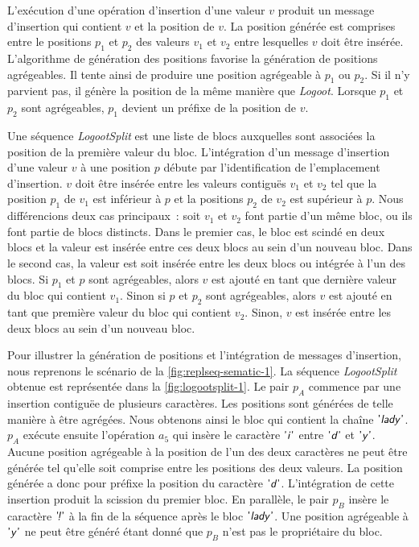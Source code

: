 L'exécution d'une opération d'insertion d'une valeur $v$ produit un message d'insertion qui contient $v$ et la position de $v$.
La position générée est comprises entre le positions $p_1$ et $p_2$ des valeurs $v_1$ et $v_2$ entre lesquelles $v$ doit être insérée.
L'algorithme de génération des positions favorise la génération de positions agrégeables.
Il tente ainsi de produire une position agrégeable à $p_1$ ou $p_2$.
Si il n'y parvient pas, il génère la position de la même manière que \emph{Logoot}.
Lorsque $p_1$ et $p_2$ sont agrégeables, $p_1$ devient un préfixe de la position de $v$.

Une séquence \emph{LogootSplit} est une liste de blocs auxquelles sont associées la position de la première valeur du bloc.
L'intégration d'un message d'insertion d'une valeur $v$ à une position $p$ débute par l'identification de l'emplacement d'insertion.
$v$ doit être insérée entre les valeurs contiguës $v_1$ et $v_2$ tel que la position $p_1$ de $v_1$ est inférieur à $p$ et la positions $p_2$ de $v_2$ est supérieur à $p$.
Nous différencions deux cas principaux~: soit $v_1$ et $v_2$ font partie d'un même bloc, ou ils font partie de blocs distincts.
Dans le premier cas, le bloc est scindé en deux blocs et la valeur est insérée entre ces deux blocs au sein d'un nouveau bloc.
Dans le second cas, la valeur est soit insérée entre les deux blocs ou intégrée à l'un des blocs.
Si $p_1$ et $p$ sont agrégeables, alors $v$ est ajouté en tant que dernière valeur du bloc qui contient $v_1$.
Sinon si $p$ et $p_2$ sont agrégeables, alors $v$ est ajouté en tant que première valeur du bloc qui contient $v_2$.
Sinon, $v$ est insérée entre les deux blocs au sein d'un nouveau bloc.

Pour illustrer la génération de positions et l'intégration de messages d'insertion, nous reprenons le scénario de la \autoref{fig:replseq-sematic-1}.
La séquence \emph{LogootSplit} obtenue est représentée dans la \autoref{fig:logootsplit-1}.
Le pair $p_A$ commence par une insertion contiguëe de plusieurs caractères.
Les positions sont générées de telle manière à être agrégées.
Nous obtenons ainsi le bloc qui contient la chaîne $\textsf{'\textit{lady}'}$.
$p_A$ exécute ensuite l'opération $a_5$ qui insère le caractère $\textsf{'\textit{i}'}$ entre $\textsf{'\textit{d}'}$ et $\textsf{'\textit{y}'}$.
Aucune position agrégeable à la position de l'un des deux caractères ne peut être générée tel qu'elle soit comprise entre les positions des deux valeurs.
La position générée a donc pour préfixe la position du caractère $\textsf{'\textit{d}'}$.
L'intégration de cette insertion produit la scission du premier bloc.
En parallèle, le pair $p_B$ insère le caractère $\textsf{'\textit{\negthinspace!}'}$ à la fin de la séquence après le bloc $\textsf{'\textit{lady}'}$.
Une position agrégeable à $\textsf{'\textit{y}'}$ ne peut être généré étant donné que $p_B$ n'est pas le propriétaire du bloc.

